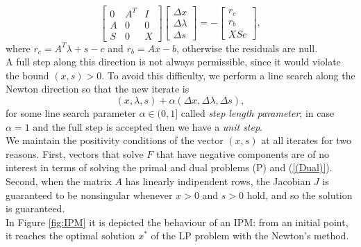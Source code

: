 \documentclass[a4paper,10 pt,titlepage,twoside]{report}
\theoremstyle{plain}
\theoremstyle{definition}
\theoremstyle{remark}
\begin{document}
\begin{equation}\label{(5.1)}
	\begin{bmatrix}
0&A^{T}&I \\A&0&0\\S&0&X
	\end{bmatrix}\begin{bmatrix}
	\Delta x\\\Delta\lambda \\\Delta s
	\end{bmatrix}=-\begin{bmatrix}
	r_{c}\\r_{b}\\XSe
	\end{bmatrix},
\end{equation}
where $r_{c}= A^{T}\lambda+s-c$ and $r_{b}= Ax-b$, otherwise the residuals are null.\\
A full step along this direction is not always permissible, since it would violate the bound $(x,s)>0$. To avoid this difficulty, we perform a line search along the Newton direction so that the new iterate is
\begin{equation*}
	(x,\lambda,s) +\alpha (\Delta x,\Delta \lambda,\Delta s),
\end{equation*} 
for some line search parameter $\alpha \in (0,1]$ called \textit{step length parameter}; in case $\alpha = 1$ and the full step is accepted then we have a \textit{unit step}.\\We maintain the positivity conditions of the vector $(x,s)$ at all iterates for two reasons. First, vectors that solve $\mathit{F}$ that have negative components are of no interest in terms of solving the primal and dual problems (P) and (\ref{(Dual)}). Second, when the matrix $A$ has linearly indipendent rows, the Jacobian $J$ is guaranteed to be nonsingular whenever $x>0$ and $s>0$ hold, and so the solution is guaranteed. %
\\
In Figure \ref{fig:IPM} it is depicted the behaviour of an IPM: from an initial point, it reaches the optimal solution $x^{*}$ of the LP problem \label{LPexample} with the Newton's method.
\end{document}
